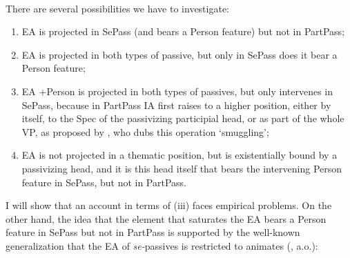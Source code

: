 \documentclass[output=paper]{langsci/langscibook}
\begin{document}
\ea%
    \label{ex:giurgea:27}\\
    \z
\z


There are several possibilities we have to investigate:

\begin{enumerate}[label=(\roman*)]
\item EA is projected in SePass (and bears a Person feature) but not in PartPass; 
\item EA is projected in both types of passive, but only in SePass does it bear a Person feature;
\item EA +Person is projected in both types of passives, but only intervenes in SePass, because in PartPass IA first raises to a higher position, either by itself, to the Spec of the passivizing participial head, or as part of the whole VP, as proposed by \citet{Collins2005}, who dubs this operation ‘smuggling'; 
\item EA is not projected in a thematic position, but is existentially bound by a passivizing head, and it is this head itself that bears the intervening Person feature in SePass, but not in PartPass.
\end{enumerate} 


  I will show that an account in terms of (iii) faces empirical problems. On the other hand, the idea that the element that saturates the EA bears a Person feature in SePass but not in PartPass is supported by the well-known generalization that the EA of \textit{se-}passives is restricted to animates (\citealt{Burzio1994,Cornilescu1998,Dobrovie-Sorin2017,Zribi-Hertz2008}, a.o.):
\end{document}
